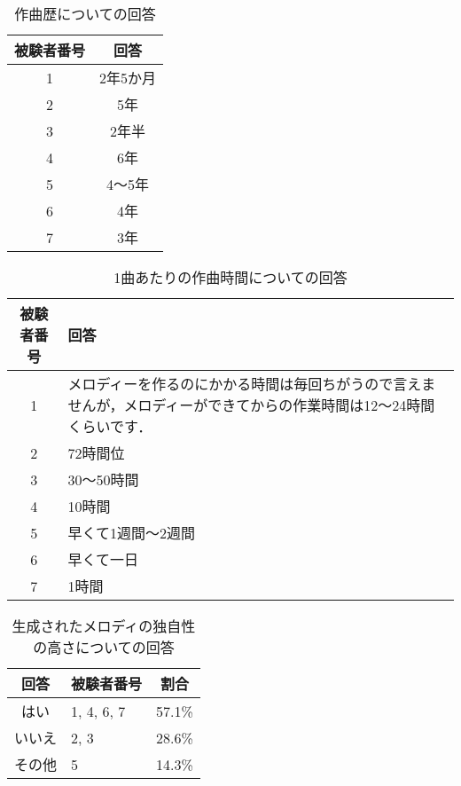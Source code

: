 \begin{table}[htbp]
  \begin{center}
    \caption{作曲歴についての回答}
    \begin{tabular}{cc}
      \hline
      被験者番号 & 回答 \\ \hline \hline
      1 & 2年5か月\rule[-3mm]{0mm}{8mm} \\ \hline
      2 & 5年\rule[-3mm]{0mm}{8mm} \\ \hline
      3 & 2年半\rule[-3mm]{0mm}{8mm} \\ \hline
      4 & 6年\rule[-3mm]{0mm}{8mm} \\ \hline
      5 & 4〜5年\rule[-3mm]{0mm}{8mm} \\ \hline
      6 & 4年\rule[-3mm]{0mm}{8mm} \\ \hline
      7 & 3年\rule[-3mm]{0mm}{8mm} \\ \hline
    \end{tabular}
  \end{center}
\end{table}

\begin{table}[htbp]
  \begin{center}
    \caption{1曲あたりの作曲時間についての回答}
    \begin{tabular}{cp{30em}}
      \hline
      被験者番号 & 回答\rule[-3mm]{0mm}{8mm} \\ \hline \hline
      1 & メロディーを作るのにかかる時間は毎回ちがうので言えませんが，メロディーができてからの作業時間は12～24時間くらいです．\rule[-3mm]{0mm}{8mm} \\ \hline
      2 & 72時間位\rule[-3mm]{0mm}{8mm} \\ \hline
      3 & 30〜50時間\rule[-3mm]{0mm}{8mm} \\ \hline
      4 & 10時間\rule[-3mm]{0mm}{8mm} \\ \hline
      5 & 早くて1週間〜2週間\rule[-3mm]{0mm}{8mm} \\ \hline
      6 & 早くて一日\rule[-3mm]{0mm}{8mm} \\ \hline
      7 & 1時間\rule[-3mm]{0mm}{8mm} \\ \hline
    \end{tabular}
  \end{center}
\end{table}

\begin{table}[htbp]
  \begin{center}
    \caption{生成されたメロディの独自性の高さについての回答}
    \begin{tabular}{|c|p{10em}|c|}
      \hline
      回答 & 被験者番号 & 割合\rule[-3mm]{0mm}{8mm} \\ \hline \hline
      はい & 1, 4, 6, 7 & 57.1\% \rule[-3mm]{0mm}{8mm} \\ \hline
      いいえ & 2, 3 & 28.6\% \rule[-3mm]{0mm}{8mm} \\ \hline
      その他 & 5 & 14.3\% \rule[-3mm]{0mm}{8mm} \\ \hline
    \end{tabular}
  \end{center}
\end{table}

